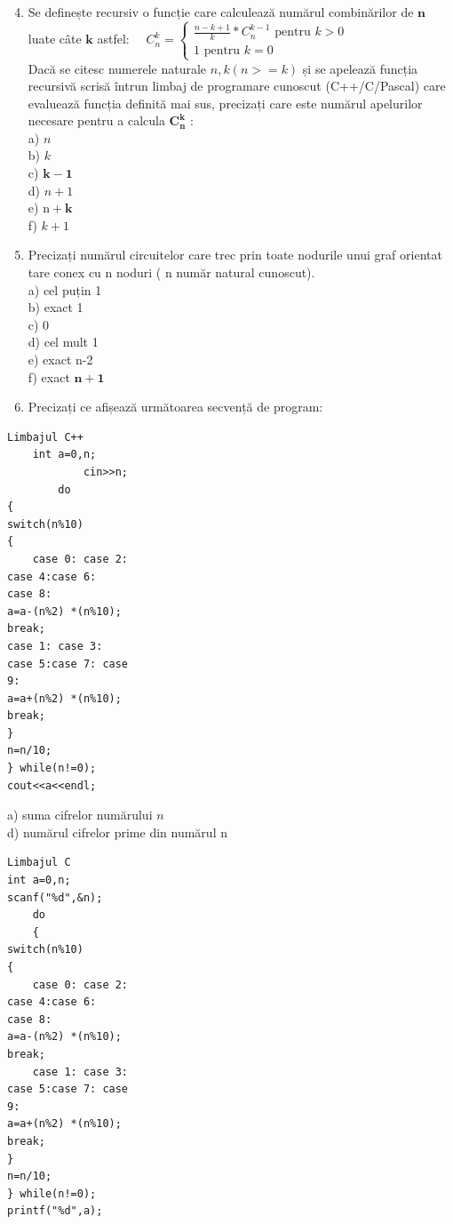 \documentclass[10pt]{article}
\begin{document}
\begin{enumerate}
  \setcounter{enumi}{3}
  \item Se definește recursiv o funcție care calculează numărul combinărilor de $\mathbf{n}$ luate câte $\mathbf{k}$ astfel: $\quad C_{n}^{k}=\left\{\begin{array}{c}\frac{n-k+1}{k} * C_{n}^{k-1} \text { pentru } k>0 \\ 1 \text { pentru } k=0\end{array}\right.$\\
Dacă se citesc numerele naturale $n, k(n>=k)$ și se apelează funcția recursivă scrisă întrun limbaj de programare cunoscut (C++/C/Pascal) care evaluează funcția definită mai sus, precizați care este numărul apelurilor necesare pentru a calcula $\boldsymbol{C}_{\boldsymbol{n}}^{\boldsymbol{k}}$ :\\
a) $n$\\
b) $k$\\
c) $\mathbf{k - 1}$\\
d) $n+1$\\
e) $\mathrm{n}+\mathbf{k}$\\
f) $k+1$
  \item Precizați numărul circuitelor care trec prin toate nodurile unui graf orientat tare conex cu n noduri ( n număr natural cunoscut).\\
a) cel puțin 1\\
b) exact 1\\
c) 0\\
d) cel mult 1\\
e) exact n-2\\
f) exact $\mathbf{n + 1}$
  \item Precizați ce afișează următoarea secvență de program:
\end{enumerate}

\begin{verbatim}
Limbajul C++
    int a=0,n;
            cin>>n;
        do
{
switch(n%10)
{
    case 0: case 2:
case 4:case 6:
case 8:
a=a-(n%2) *(n%10);
break;
case 1: case 3:
case 5:case 7: case
9:
a=a+(n%2) *(n%10);
break;
}
n=n/10;
} while(n!=0);
cout<<a<<endl;
\end{verbatim}

a) suma cifrelor numărului $n$\\
d) numărul cifrelor prime din numărul n

\begin{verbatim}
Limbajul C
int a=0,n;
scanf("%d",&n);
    do
    {
switch(n%10)
{
    case 0: case 2:
case 4:case 6:
case 8:
a=a-(n%2) *(n%10);
break;
    case 1: case 3:
case 5:case 7: case
9:
a=a+(n%2) *(n%10);
break;
}
n=n/10;
} while(n!=0);
printf("%d",a);
\end{verbatim}
\end{document}
